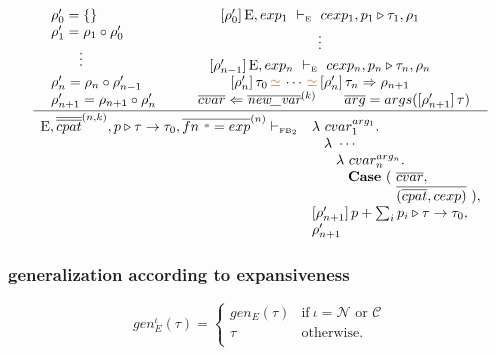 \documentclass[11pt,a4paper]{article}
\newcommand{\key}[1]{\textrm{\textbf{#1}}}
\newcommand{\qualtype}[2]{#1 \triangleright #2}
\newcommand{\unifylist}[3]{#1\,{\color{brown}{\simeq}}\,\cdots\,{\color{brown}{\simeq}}\,#2 \Rightarrow #3}
\newcommand{\subst}[2]{[#1]\,#2}
\newcommand{\braced}[1]{\{#1\}}
\newcommand{\wildcard}{{\color{gray}\scriptstyle\textbf{*}}}
\newcommand{\compose}[2]{#1 \circ #2}
\newcommand{\Env}  {\textrm{E}}
\newcommand{\sFB}   {\textrm{\tiny FB}}
\newcommand{\lam}  {\mathbf\lambda}
\newcommand{\Empty}{\braced{}}
\newcommand{\vdashE}  {\ \vdash_{\textrm{\tiny E}}\  }
\newcommand{\xpc}{\mathcal{C}}
\newcommand{\nxp}{\mathcal{N}}
\newcommand{\corenew}[1]{\textit{new\_#1}}
\newcommand{\vect}[1]{\overline{#1}}
\begin{document}
\[
\cfrac
 {\begin{array}{lc}
  \rho'_0 = \Empty 
  & \subst{\rho'_0}\Env, exp_1 \vdashE cexp_1,\qualtype{p_1}{\tau_1},\rho_1 \\
  \rho'_1 = \compose{\rho_1}{\rho'_0} & \multirow{2}{*}{\vdots} \\
  \multirow{2}{*}{\qquad\vdots}  &  \\
  & \subst{\rho'_{n-1}}\Env, exp_n \vdashE cexp_n,\qualtype{p_n}{\tau_n},\rho_n \\
  \rho'_n = \compose{\rho_n}{\rho'_{n-1}}
  & \unifylist{\subst{\rho'_n}{\tau_0}}{\subst{\rho'_n}{\tau_n}}{\rho_{n+1}} \\ 
  \rho'_{n+1} = \compose{\rho_{n+1}}{\rho'_n}
  & \qquad \vect{cvar} \Leftarrow \vect{\corenew{var}}^{(k)} \qquad \vect{arg} = args(\subst{\rho'_{n+1}}{\tau}) \\
  \end{array}
 }
 {\begin{array}{ll}
  \Env,\vect{\vect{cpat}}^{(n,k)},\qualtype{p}{\tau\to\tau_0},\vect{fn\ \wildcard = exp}^{(n)} \vdash_{\sFB_2}
   & \lam\ cvar_1^{arg_1}.                      \\
   & \hspace{2ex}\lam\ \cdots                   \\
   & \hspace{4ex}\lam\ cvar_n^{arg_n}.          \\
   & \hspace{6ex}\key{Case}\ (\ \vect{cvar},    \\
   & \hspace{14ex}\vect{(\vect{cpat}, cexp)}\ ),\\
   & \subst{\rho'_{n+1}}{\qualtype{p+\sum_i p_i}{\tau\to\tau_0}}, \\
   & \rho'_{n+1} \\
  \end{array}}
\]

\subsubsection {generalization according to expansiveness}
\[ 
	gen_E^\iota(\tau) = \left\{\begin{array}{cl}
						gen_E(\tau)	& \textrm{if}\ \iota = \nxp \textrm{ or } \xpc \\
						\tau		& \textrm{otherwise.}				\\
						\end{array}\right.
\]
\end{document}
